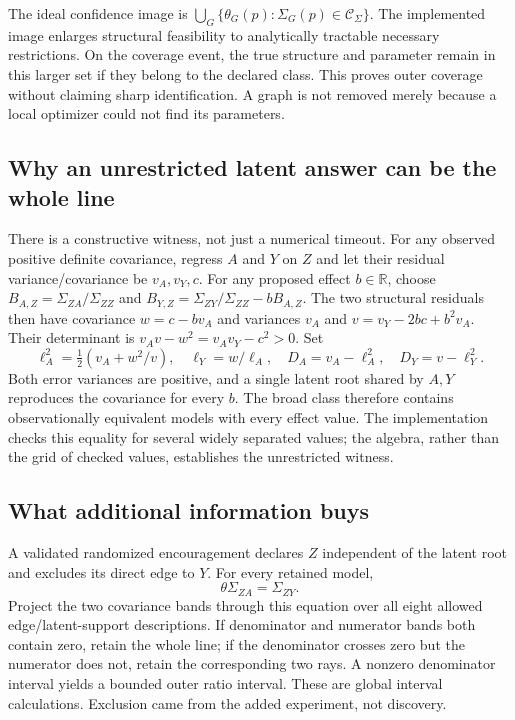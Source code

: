 The ideal confidence image is
$\bigcup_G\{\theta_G(p):\Sigma_G(p)\in\mathcal C_\Sigma\}$.
The implemented image enlarges structural feasibility to analytically
tractable necessary restrictions. On the coverage event, the true structure
and parameter remain in this larger set if they belong to the declared class.
This proves outer coverage without claiming sharp identification. A graph is
not removed merely because a local optimizer could not find its parameters.

\subsection{Why an unrestricted latent answer can be the whole line}
There is a constructive witness, not just a numerical timeout. For any observed
positive definite covariance, regress $A$ and $Y$ on $Z$ and let their residual
variance/covariance be $v_A,v_Y,c$. For any proposed effect $b\in\mathbb R$,
choose $B_{A,Z}=\Sigma_{ZA}/\Sigma_{ZZ}$ and
$B_{Y,Z}=\Sigma_{ZY}/\Sigma_{ZZ}-bB_{A,Z}$. The two structural residuals
then have covariance $w=c-bv_A$ and variances $v_A$ and
$v=v_Y-2bc+b^2v_A$. Their determinant is
$v_Av-w^2=v_Av_Y-c^2>0$.
Set
\[
 \ell_A^2=\tfrac12(v_A+w^2/v),\quad
 \ell_Y=w/\ell_A,\quad
 D_A=v_A-\ell_A^2,\quad D_Y=v-\ell_Y^2.
\]
Both error variances are positive, and a single latent root shared by $A,Y$
reproduces the covariance for every $b$. The broad class therefore contains
observationally equivalent models with every effect value. The implementation
checks this equality for several widely separated values; the algebra, rather
than the grid of checked values, establishes the unrestricted witness.

\subsection{What additional information buys}
A validated randomized encouragement declares $Z$ independent of the latent
root and excludes its direct edge to $Y$. For every retained model,
\begin{equation}
 \theta\Sigma_{ZA}=\Sigma_{ZY}.
 \label{c7:graph-iv-restriction}
\end{equation}
Project the two covariance bands through this equation over all eight allowed
edge/latent-support descriptions. If denominator and numerator bands both
contain zero, retain the whole line; if the denominator crosses zero but the
numerator does not, retain the corresponding two rays. A nonzero denominator
interval yields a bounded outer ratio interval. These are global interval
calculations. Exclusion came from the added experiment, not discovery.

